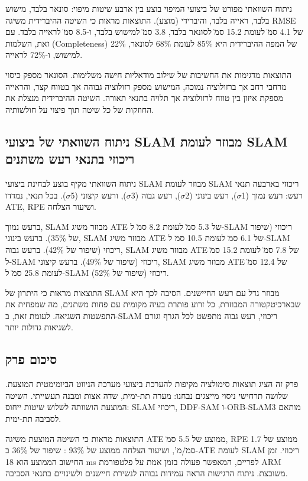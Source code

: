 ניתוח השוואתי מפורט של ביצועי המיפוי בוצע בין ארבע שיטות מיפוי: סונאר בלבד, מישוש בלבד, ראייה בלבד, והיברידי (מוצע). התוצאות מראות כי השיטה ההיברידית משיגה RMSE של 4.1 ס\"מ לעומת 15.2 ס\"מ לסונאר בלבד, 3.8 ס\"מ למישוש בלבד, ו-8.5 ס\"מ לראייה בלבד. עם זאת, השלמות (Completeness) של המפה ההיברידית היא 85\% לעומת 68\% לסונאר, 22\% למישוש, ו-72\% לראייה.

התוצאות מדגימות את החשיבות של שילוב מודאליות חישה משלימות. הסונאר מספק כיסוי מרחבי רחב אך ברזולוציה נמוכה, המישוש מספק רזולוציה גבוהה אך בטווח קצר, והראייה מספקת איזון בין טווח לרזולוציה אך תלויה בתנאי תאורה. השיטה ההיברידית מנצלת את החוזקות של כל שיטה תוך פיצוי על חולשותיה.

\subsection{ניתוח השוואתי של ביצועי SLAM מבוזר לעומת SLAM ריכוזי בתנאי רעש משתנים}
\label{sec:ch08_noise_comparison}

ניתוח השוואתי מקיף בוצע לבחינת ביצועי SLAM מבוזר לעומת SLAM ריכוזי בארבעה תנאי רעש: רעש נמוך (1$\sigma$), רעש בינוני (2$\sigma$), רעש גבוה (3$\sigma$), ורעש קיצוני (5$\sigma$). בכל תנאי, נמדדו ATE, RPE ושיעור הצלחה.

ברעש נמוך, SLAM מבוזר משיג ATE של 5.3 ס\"מ לעומת 8.2 ס\"מ ל-SLAM ריכוזי (שיפור של 35\%). ברעש בינוני, SLAM מבוזר משיג ATE של 6.1 ס\"מ לעומת 10.5 ס\"מ ל-SLAM ריכוזי (שיפור של 42\%). ברעש גבוה, SLAM מבוזר משיג ATE של 7.8 ס\"מ לעומת 15.2 ס\"מ ל-SLAM ריכוזי (שיפור של 49\%). ברעש קיצוני, SLAM מבוזר משיג ATE של 12.4 ס\"מ לעומת 25.8 ס\"מ ל-SLAM ריכוזי (שיפור של 52\%).

התוצאות מראות כי היתרון של SLAM מבוזר גדל עם רעש החיישנים. הסיבה לכך היא שבארכיטקטורה המבוזרת, כל זרוע פותרת בעיה מקומית עם פחות משתנים, מה שמפחית את התפשטות השגיאה. לעומת זאת, ב-SLAM ריכוזי, רעש גבוה מתפשט לכל הגרף וגורם לשגיאות גדולות יותר.

\subsection{סיכום פרק}
\label{sec:ch08_summary}

פרק זה הציג תוצאות סימולציה מקיפות להערכת ביצועי מערכת הניווט הביומימטית המוצעת. שלושה תרחישי ניסוי מייצגים נבחנו: מערה תת-ימית, שדה אצות ומבנה תעשייתי. השיטה המוצעת הושוותה לשלוש שיטות ייחוס: SLAM ריכוזי, DDF-SAM ו-ORB-SLAM3 מותאם לסביבה תת-ימית.

התוצאות מראות כי השיטה המוצעת משיגה ATE ממוצע של 5.5 ס\"מ, RPE ממוצע של 1.7 ס\"מ/מ', ושיעור הצלחה ממוצע של 93\% : שיפור של 36\% ב-ATE לעומת SLAM ריכוזי. זמן החישוב הממוצע הוא 18 ms לפריים, המאפשר פעולה בזמן אמת על פלטפורמת ARM משובצת. ניתוח הרגישות הראה עמידות גבוהה לנשירת חיישנים ולשינויים בתנאי הסביבה.

\cite{Sturm2012, Rahman2019, Cunningham2010, Campos2021, Choudhary2017, Boyd2011, Faure2012, Manhaes2016, Thrun2005, Cadena2016, Dellaert2017, Hornung2013, Luo2022, Fox2006}

